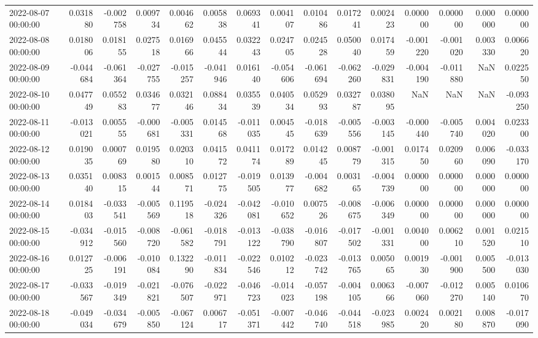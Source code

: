 \begin{tabular}{lrrrrrrrrrrrrrr}
2022-08-07 00:00:00 & 0.031880 & -0.002758 & 0.009734 & 0.004662 & 0.005838 & 0.069341 & 0.004107 & 0.010486 & 0.017241 & 0.002423 & 0.000000 & 0.000000 & 0.000000 & 0.000000 \\
2022-08-08 00:00:00 & 0.018006 & 0.018155 & 0.027518 & 0.016966 & 0.045544 & 0.032243 & 0.024705 & 0.024528 & 0.050040 & 0.017459 & -0.001220 & -0.001020 & 0.003330 & 0.006620 \\
2022-08-09 00:00:00 & -0.044684 & -0.061364 & -0.027755 & -0.015257 & -0.041946 & 0.016140 & -0.054606 & -0.061694 & -0.062260 & -0.029831 & -0.004190 & -0.011880 & NaN & 0.022550 \\
2022-08-10 00:00:00 & 0.047749 & 0.055283 & 0.034677 & 0.032146 & 0.088434 & 0.035539 & 0.040534 & 0.052993 & 0.032787 & 0.038095 & NaN & NaN & NaN & -0.093250 \\
2022-08-11 00:00:00 & -0.013021 & 0.005555 & -0.000681 & -0.005331 & 0.014568 & -0.011035 & 0.004545 & -0.018639 & -0.005556 & -0.003145 & -0.000440 & -0.005740 & 0.004020 & 0.023300 \\
2022-08-12 00:00:00 & 0.019035 & 0.000769 & 0.019580 & 0.020310 & 0.041572 & 0.041174 & 0.017289 & 0.014245 & 0.008779 & -0.001315 & 0.017450 & 0.020960 & 0.006090 & -0.033170 \\
2022-08-13 00:00:00 & 0.035140 & 0.008315 & 0.001544 & 0.008571 & 0.012775 & -0.019505 & 0.013977 & -0.004682 & 0.003165 & -0.004739 & 0.000000 & 0.000000 & 0.000000 & 0.000000 \\
2022-08-14 00:00:00 & 0.018403 & -0.033541 & -0.005569 & 0.119518 & -0.024326 & -0.042081 & -0.010652 & 0.007526 & -0.008675 & -0.006349 & 0.000000 & 0.000000 & 0.000000 & 0.000000 \\
2022-08-15 00:00:00 & -0.034912 & -0.015560 & -0.008720 & -0.061582 & -0.018791 & -0.013122 & -0.038790 & -0.016807 & -0.017502 & -0.001331 & 0.004000 & 0.006210 & 0.001520 & 0.021510 \\
2022-08-16 00:00:00 & 0.012725 & -0.006191 & -0.010084 & 0.132290 & -0.011834 & -0.022546 & 0.010212 & -0.023742 & -0.013765 & 0.005065 & 0.001930 & -0.001900 & 0.005500 & -0.013030 \\
2022-08-17 00:00:00 & -0.033567 & -0.019349 & -0.021821 & -0.076507 & -0.022971 & -0.046723 & -0.014023 & -0.057198 & -0.004105 & 0.006366 & -0.007060 & -0.012270 & 0.005140 & 0.010670 \\
2022-08-18 00:00:00 & -0.049034 & -0.034679 & -0.005850 & -0.067124 & 0.006717 & -0.051371 & -0.007442 & -0.046740 & -0.044518 & -0.023985 & 0.002420 & 0.002180 & 0.008870 & -0.017090 \\

\end{tabular}

